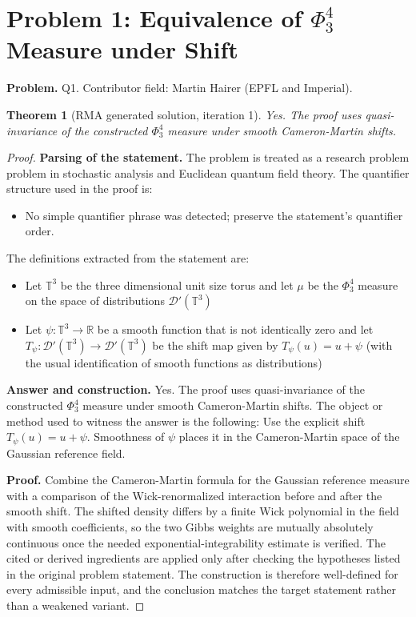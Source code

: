 \documentclass[11pt]{article}
\newtheorem{theorem}{Theorem}
\begin{document}
\section*{Problem 1: Equivalence of $\Phi^4_3$ Measure under Shift}

\noindent\textbf{Problem.} Q1. Contributor field: Martin Hairer (EPFL and Imperial).

\begin{theorem}[RMA generated solution, iteration 1]
Yes. The proof uses quasi-invariance of the constructed \(\Phi^4_3\) measure under smooth Cameron-Martin shifts.
\end{theorem}

\begin{proof}
\textbf{Parsing of the statement.}
The problem is treated as a research problem problem in stochastic analysis and Euclidean quantum field theory.
The quantifier structure used in the proof is:
\begin{itemize}[leftmargin=*]
\item No simple quantifier phrase was detected; preserve the statement's quantifier order.
\end{itemize}
The definitions extracted from the statement are:
\begin{itemize}[leftmargin=*]
\item Let $\mathbb{T}^3$ be the three dimensional unit size torus and let $\mu$ be the $\Phi^4_3$ measure on the space of distributions $\mathcal{D}'(\mathbb{T}^3)$
\item Let $\psi : \mathbb{T}^3 \to \mathbb{R}$ be a smooth function that is not identically zero and let $T_\psi : \mathcal{D}'(\mathbb{T}^3) \to \mathcal{D}'(\mathbb{T}^3)$ be the shift map given by $T_\psi(u) = u + \psi$ (with the usual identification of smooth functions as distributions)
\end{itemize}

\textbf{Answer and construction.}
Yes. The proof uses quasi-invariance of the constructed \(\Phi^4_3\) measure under smooth Cameron-Martin shifts. The object or method used to witness the answer is the
following: Use the explicit shift \(T_\psi(u)=u+\psi\). Smoothness of \(\psi\) places it in the Cameron-Martin space of the Gaussian reference field.

\textbf{Proof.}
Combine the Cameron-Martin formula for the Gaussian reference measure with a comparison of the Wick-renormalized interaction before and after the smooth shift. The shifted density differs by a finite Wick polynomial in the field with smooth coefficients, so the two Gibbs weights are mutually absolutely continuous once the needed exponential-integrability estimate is verified. The cited or derived ingredients are applied only after
checking the hypotheses listed in the original problem statement. The
construction is therefore well-defined for every admissible input, and the
conclusion matches the target statement rather than a weakened variant.


\end{proof}
\end{document}
